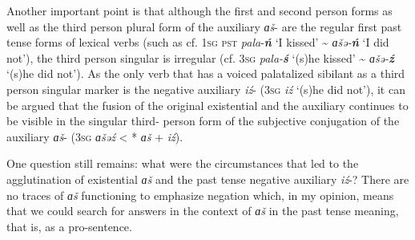\documentclass[output=paper]{langsci/langscibook}
\begin{document}
  Another important point is that although the first and second person forms as well as the third person plural form of the auxiliary \textit{ɑš}- are the regular first past tense forms of lexical verbs (such as cf. 1\textsc{sg} \textsc{pst} \textit{pala}-\textbf{\textit{ń}} `I kissed' {\textasciitilde} \textit{ɑšə-}\textbf{\textit{ń}} `I did not'), the third person singular is irregular (cf. 3\textsc{sg} \textit{pala-}\textbf{\textit{ś}} `(s)he kissed' {\textasciitilde} \textit{ɑšə-}\textbf{\textit{ź}} `(s)he did not'). As the only verb that has a voiced palatalized sibilant as a third person singular marker is the negative auxiliary \textit{iź}- (3\textsc{sg} \textit{iź} `(s)he did not'), it can be argued that the fusion of the original existential and the auxiliary continues to be visible in the singular third- person form of the subjective conjugation of the auxiliary \textit{ɑš}- (3\textsc{sg} \textit{ɑšəź} < * \textit{ɑš} + \textit{iź}).

  One question still remains: what were the circumstances that led to the agglutination of existential \textit{ɑš} and the past tense negative auxiliary \textit{iź}-? There are no traces of \textit{ɑš} functioning to emphasize negation which, in my opinion, means that we could search for answers in the context of \textit{ɑš} in the past tense meaning, that is, as a pro-sentence.
\end{document}
